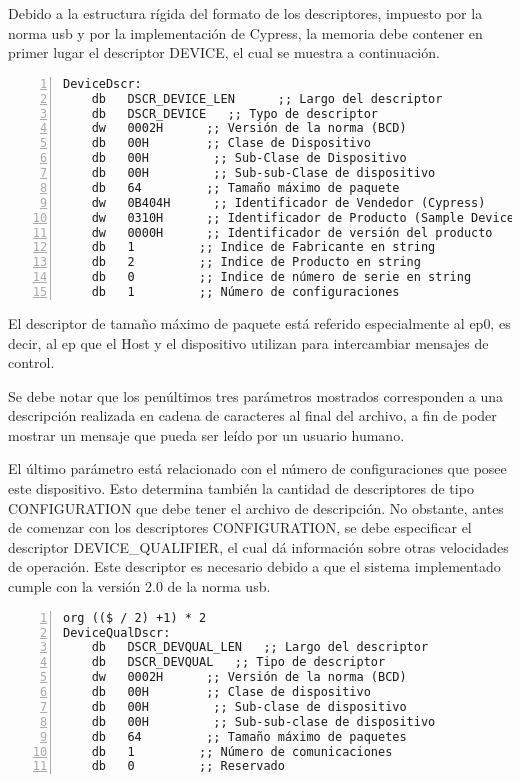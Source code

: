 	Debido a la estructura rígida del formato de los descriptores, impuesto por la norma \acrshort{usb} y por la implementación de Cypress, la memoria debe contener en primer lugar el descriptor DEVICE, el cual se muestra a continuación.
	
	\begin{lstlisting}[language={[x86masm]Assembler},backgroundcolor=\color{gray!30},numbers=left]
DeviceDscr:
	db   DSCR_DEVICE_LEN      ;; Largo del descriptor
	db   DSCR_DEVICE   ;; Typo de descriptor
	dw   0002H      ;; Versión de la norma (BCD)
	db   00H        ;; Clase de Dispositivo
	db   00H         ;; Sub-Clase de Dispositivo
	db   00H         ;; Sub-sub-Clase de dispositivo
	db   64         ;; Tamaño máximo de paquete
	dw   0B404H      ;; Identificador de Vendedor (Cypress) 
	dw   0310H      ;; Identificador de Producto (Sample Device)
	dw   0000H      ;; Identificador de versión del producto
	db   1         ;; Indice de Fabricante en string
	db   2         ;; Indice de Producto en string
	db   0         ;; Indice de número de serie en string
	db   1         ;; Número de configuraciones
	\end{lstlisting}
	
	El descriptor de tamaño máximo de paquete está referido especialmente al \acrshort{ep}0, es decir, al \acrlong{ep} que el Host y el dispositivo utilizan para intercambiar mensajes de control.
	
	Se debe notar que los penúltimos tres parámetros mostrados corresponden a una descripción realizada en cadena de caracteres al final del archivo, a fin de poder mostrar un mensaje que pueda ser leído por un usuario humano.
	
	El último parámetro está relacionado con el número de configuraciones que posee este dispositivo. Esto determina también la cantidad de descriptores de tipo CONFIGURATION que debe tener el archivo de descripción. No obstante, antes de comenzar con los descriptores CONFIGURATION, se debe especificar el descriptor DEVICE\_QUALIFIER, el cual dá información sobre otras velocidades de operación. Este descriptor es necesario debido a que el sistema implementado cumple con la versión 2.0 de la norma \acrshort{usb}.
	
	\begin{lstlisting}[language={[x86masm]Assembler},backgroundcolor=\color{gray!30},numbers=left]
org (($ / 2) +1) * 2
DeviceQualDscr:
	db   DSCR_DEVQUAL_LEN   ;; Largo del descriptor
	db   DSCR_DEVQUAL   ;; Tipo de descriptor
	dw   0002H      ;; Versión de la norma (BCD)
	db   00H        ;; Clase de dispositivo
	db   00H         ;; Sub-clase de dispositivo
	db   00H         ;; Sub-sub-clase de dispositivo
	db   64         ;; Tamaño máximo de paquetes
	db   1         ;; Número de comunicaciones
	db   0         ;; Reservado
	\end{lstlisting}
	
